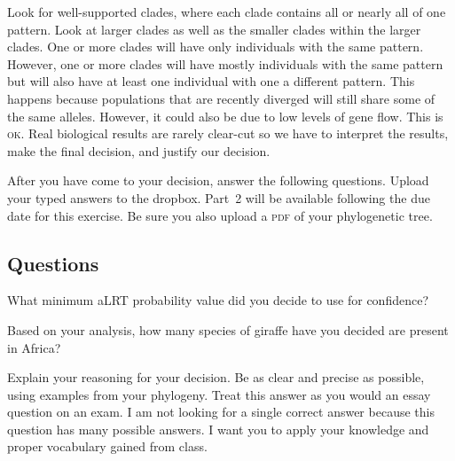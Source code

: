 \documentclass[11pt, addpoints]{exam}
\begin{document}
Look for well-supported clades, where each clade contains all or nearly
all of one pattern. Look at larger clades as well as the smaller clades
within the larger clades. One or more clades will have only individuals
with the same pattern. However, one or more clades will have mostly
individuals with the same pattern but will also have at least one
individual with one a different pattern. This happens because
populations that are recently diverged will still share some of the same
alleles. However, it could also be due to low levels of gene flow. This
is \textsc{ok}. Real biological results are rarely clear-cut so we have to
interpret the results, make the final decision, and justify our
decision.

After you have come to your decision, answer the following questions. 
Upload your typed answers to the dropbox. Part~2 will be available following 
the due date for this exercise. Be sure you also upload a \textsc{pdf} of your phylogenetic tree.


\subsection*{Questions}
\label{sec:questions}

\begin{questions}

\question[1]
What minimum aLRT probability value did you decide to use for
confidence?

\question[1]
Based on your analysis, how many species of giraffe have you decided
are present in Africa? 

\question[10]
Explain your reasoning for your decision. Be as clear and
precise as possible, using examples from your phylogeny. Treat this
answer as you would an essay question on an exam. I am not looking for a
single correct answer because this question has many possible answers. I want you to
apply your knowledge and proper vocabulary gained from class.

\end{questions}
\end{document}
